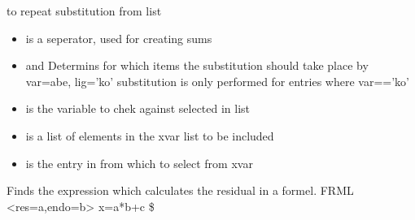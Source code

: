 \documentclass[letterpaper,10pt,english]{sphinxmanual}
\begin{document}
\begin{fulllineitems}
\label{\detokenize{index:modelmanipulation.sub_frml}}
\pysigstartsignatures
{}
\pysigstopsignatures
\sphinxAtStartPar
to repeat substitution from list
\begin{itemize}
\item {} 
\sphinxAtStartPar
{} is a seperator, used for creating sums

\item {} 
\sphinxAtStartPar
{} and  Determins for which items the substitution should take place
by var=abe, lig=’ko’ substitution is only performed for entries where var==’ko’

\item {} 
\sphinxAtStartPar
{} is the variable to chek against selected in list

\item {} 
\sphinxAtStartPar
{} is a list of elements in the xvar list to be included

\item {} 
\sphinxAtStartPar
{} is the entry in  from which to select from xvar

\end{itemize}

\end{fulllineitems}


\begin{fulllineitems}
\label{\detokenize{index:modelmanipulation.find_res}}
\pysigstartsignatures
{}
\pysigstopsignatures
\sphinxAtStartPar
Finds the expression which calculates the residual in a formel. FRML \textless{}res=a,endo=b\textgreater{} x=a*b+c \$

\end{fulllineitems}
\end{document}
